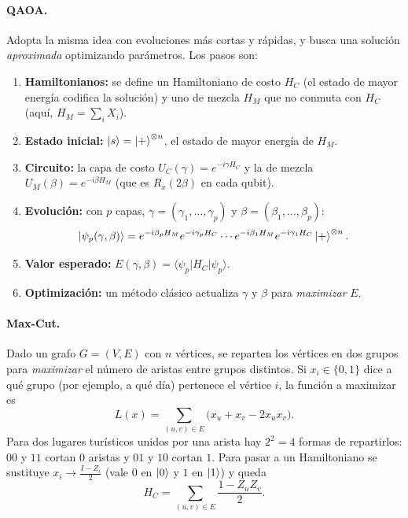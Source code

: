 \paragraph{QAOA.} Adopta la misma idea con evoluciones más cortas y rápidas, y
busca una solución \emph{aproximada} optimizando parámetros. Los pasos son:
\begin{enumerate}
  \item \textbf{Hamiltonianos:} se define un Hamiltoniano de costo $H_C$ (el
    estado de mayor energía codifica la solución) y uno de mezcla $H_M$ que no
    conmuta con $H_C$ (aquí, $H_M=\sum_iX_i$).
  \item \textbf{Estado inicial:} $\left|s\right\rangle=\left|+\right\rangle^{\otimes n}$, el estado de mayor
    energía de $H_M$.
  \item \textbf{Circuito:} la capa de costo $U_C(\gamma)=e^{-i\gamma H_C}$ y la
    de mezcla $U_M(\beta)=e^{-i\beta H_M}$ (que es $R_x(2\beta)$ en cada qubit).
  \item \textbf{Evolución:} con $p$ capas, $\gamma=(\gamma_1,\ldots,\gamma_p)$ y
    $\beta=(\beta_1,\ldots,\beta_p)$:
    \begin{equation}
      \left|\psi_p(\gamma,\beta)\right\rangle=e^{-i\beta_pH_M}e^{-i\gamma_pH_C}\cdots
      e^{-i\beta_1H_M}e^{-i\gamma_1H_C}\left|+\right\rangle^{\otimes n}.
    \end{equation}
  \item \textbf{Valor esperado:}
    $E(\gamma,\beta)=\langle\psi_p|H_C|\psi_p\rangle$.
  \item \textbf{Optimización:} un método clásico actualiza $\gamma$ y $\beta$
    para \emph{maximizar} $E$.
\end{enumerate}

\paragraph{Max-Cut.} Dado un grafo $G=(V,E)$ con $n$ vértices, se reparten los
vértices en dos grupos para \emph{maximizar} el número de aristas entre grupos
distintos. Si $x_i\in\{0,1\}$ dice a qué grupo (por ejemplo, a qué día) pertenece
el vértice $i$, la función a maximizar es
\begin{equation}
  L(x)=\sum_{(u,v)\in E}\big(x_u+x_v-2x_ux_v\big).
\end{equation}
Para dos lugares turísticos unidos por una arista hay $2^2=4$ formas de
repartirlos: $00$ y $11$ cortan $0$ aristas y $01$ y $10$ cortan $1$. Para pasar
a un Hamiltoniano se sustituye $x_i\to\frac{I-Z_i}2$ (vale $0$ en $\left|0\right\rangle$ y $1$ en
$\left|1\right\rangle$) y queda
\begin{equation}
  H_C=\sum_{(u,v)\in E}\frac{1-Z_uZ_v}{2}.
\end{equation}

